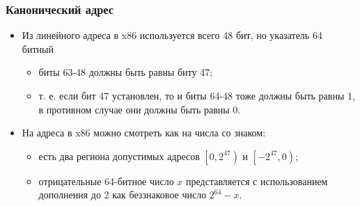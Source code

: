 \begin{frame}
\frametitle{Канонический адрес}
\begin{itemize}
  \item Из линейного адреса в x86 используется всего 48 бит, но указатель 64
  битный
  \begin{itemize}
    \item биты 63-48 должны быть равны биту 47;
    \item т. е. если бит 47 установлен, то и биты 64-48 тоже должны быть равны
    1, в противном случае они должны быть равны 0.
  \end{itemize}
  \item На адреса в x86 можно смотреть как на числа со знаком:
  \begin{itemize}
    \item есть два региона допустимых адресов $\left[0, 2^{47}\right)$ и
    $\left[-2^{47}, 0\right)$;
    \item отрицательные 64-битное число $x$ представляется с использованием
    дополнения до 2 как беззнаковое число $2^{64} - x$.
  \end{itemize}
\end{itemize}
\end{frame}
